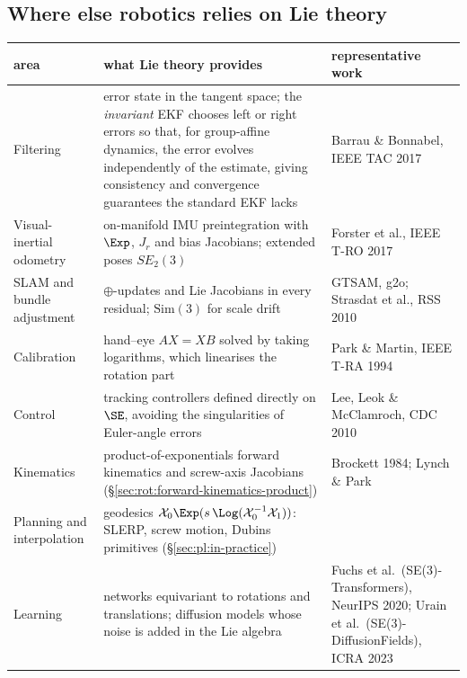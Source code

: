 \subsection{Where else robotics relies on Lie theory}\label{sec:lie:where-else}

\begin{center}\small
\renewcommand{\arraystretch}{1.2}
\begin{tabularx}{\linewidth}{@{}>{\raggedright\arraybackslash}p{3.0cm}>{\raggedright\arraybackslash}X>{\raggedright\arraybackslash}p{3.3cm}@{}}\toprule
area & what Lie theory provides & representative work\\\midrule
Filtering & error state in the tangent space; the \emph{invariant} EKF chooses left or right errors so that, for group-affine dynamics, the error evolves independently of the estimate, giving consistency and convergence guarantees the standard EKF lacks & Barrau \& Bonnabel, IEEE TAC 2017\\
Visual-inertial odometry & on-manifold IMU preintegration with $\Exp$, $J_r$ and bias Jacobians; extended poses $SE_2(3)$ & Forster et al., IEEE T-RO 2017\\
SLAM and bundle adjustment & $\oplus$-updates and Lie Jacobians in every residual; $\mathrm{Sim}(3)$ for scale drift & GTSAM, g2o; Strasdat et al., RSS 2010\\
Calibration & hand--eye $AX=XB$ solved by taking logarithms, which linearises the rotation part & Park \& Martin, IEEE T-RA 1994\\
Control & tracking controllers defined directly on $\SE$, avoiding the singularities of Euler-angle errors & Lee, Leok \& McClamroch, CDC 2010\\
Kinematics & product-of-exponentials forward kinematics and screw-axis Jacobians (\S\ref{sec:rot:forward-kinematics-product}) & Brockett 1984; Lynch \& Park\\
Planning and interpolation & geodesics $\mathcal X_0\Exp(s\,\Log(\mathcal X_0^{-1}\mathcal X_1))$: SLERP, screw motion, Dubins primitives (\S\ref{sec:pl:in-practice}) & \\
Learning & networks equivariant to rotations and translations; diffusion models whose noise is added in the Lie algebra & Fuchs et al.\ (SE(3)-Transformers), NeurIPS 2020; Urain et al.\ (SE(3)-DiffusionFields), ICRA 2023\\\bottomrule
\end{tabularx}
\end{center}

